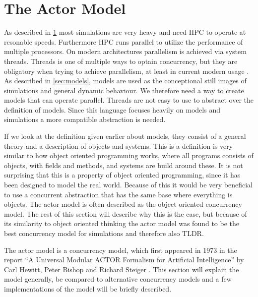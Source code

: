 \section{The Actor Model}
As described in \cref{} most simulations are very heavy and need HPC to operate at resonable speeds. Furthermore HPC runs parallel to utilize the performance of multiple processors. On modern architectures parallelism is achieved via system threads. Threads is one of multiple ways to optain concurrency, but they are obligatory when trying to achieve parallelism, at least in current modern usage . As described in \cref{sec:models}, models are used as the conceptional still images of simulations and general dynamic behaviour. We therefore need a way to create models that can operate parallel. Threads are not easy to use to abstract over the definition of models. Since this language focuses heavily on models and simulations a more compatible abstraction is needed.

If we look at the definition given earlier about models, they consist of a general theory and a description of objects and systems. This is a definition is very similar to how object oriented programming works, where all programs consists of objects, with fields and methods, and systems are build around these. It is not surprising that this is a property of object oriented programming, since it has been designed to model the real world.
Because of this it would be very beneficial to use a concurrent abstraction that has the same base where everything is objects.
The actor model is often described as the object oriented concurrency model. The rest of this section will describe why this is the case, but because of its similarity to object oriented thinking the actor model was found to be the best concurrency model for simulations and therefore also TLDR.

The actor model is a concurrency model, which first appeared in 1973 in the report \enquote{A Universal Modular ACTOR Formalism for Artificial Intelligence} by Carl Hewitt, Peter Bishop and Richard Steiger \cite{Hewitt:1973}. This section will explain the model generally, be compared to alternative concurrency models and a few implementations of the model will be briefly described.

